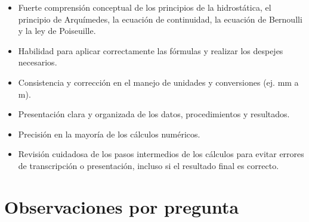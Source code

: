 \documentclass[11pt,a4paper]{article}
\begin{document}
\vspace{4pt}
\begin{minipage}[t]{0.48\linewidth}
  \begin{tcolorbox}[cajaFortaleza, title={Fortalezas}]
\begin{itemize}[leftmargin=1.5em, itemsep=2pt]
  \item Fuerte comprensión conceptual de los principios de la hidrostática, el principio de Arquímedes, la ecuación de continuidad, la ecuación de Bernoulli y la ley de Poiseuille.
  \item Habilidad para aplicar correctamente las fórmulas y realizar los despejes necesarios.
  \item Consistencia y corrección en el manejo de unidades y conversiones (ej. mm a m).
  \item Presentación clara y organizada de los datos, procedimientos y resultados.
  \item Precisión en la mayoría de los cálculos numéricos.
\end{itemize}
  \end{tcolorbox}
\end{minipage}
\hfill
\begin{minipage}[t]{0.48\linewidth}
  \begin{tcolorbox}[cajaMejora, title={Areas de mejora}]
\begin{itemize}[leftmargin=1.5em, itemsep=2pt]
  \item Revisión cuidadosa de los pasos intermedios de los cálculos para evitar errores de transcripción o presentación, incluso si el resultado final es correcto.
\end{itemize}
  \end{tcolorbox}
\end{minipage}

\section*{Observaciones por pregunta}
\end{document}
